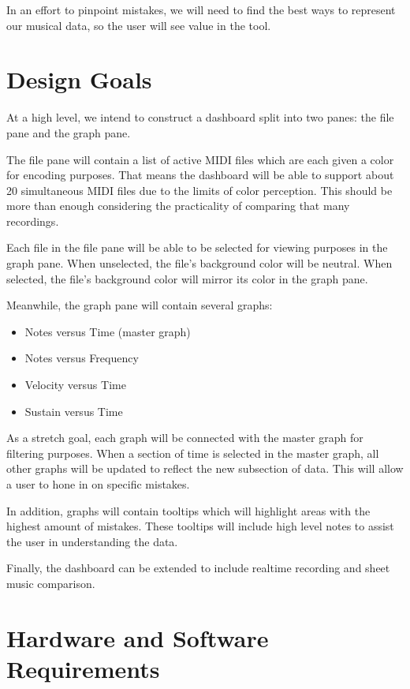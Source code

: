 \documentclass[journal]{vgtc}                %
\begin{document}
In an effort to pinpoint mistakes, we will need to find the best ways to
represent our musical data, so the user will see value in the tool.

\section{Design Goals}

At a high level, we intend to construct a dashboard split into two panes: the
file pane and the graph pane.

The file pane will contain a list of active MIDI files which are each given a
color for encoding purposes. That means the dashboard will be able to support
about 20 simultaneous MIDI files due to the limits of color perception. This
should be more than enough considering the practicality of comparing that many
recordings.

Each file in the file pane will be able to be selected for viewing purposes
in the graph pane. When unselected, the file's background color will be neutral.
When selected, the file's background color will mirror its color in the graph
pane.

Meanwhile, the graph pane will contain several graphs:

\begin{itemize}
\item Notes versus Time (master graph)
\item Notes versus Frequency
\item Velocity versus Time
\item Sustain versus Time
\end{itemize}

As a stretch goal, each graph will be connected with the master graph for
filtering purposes. When a section of time is selected in the master graph,
all other graphs will be updated to reflect the new subsection of data. This
will allow a user to hone in on specific mistakes.

In addition, graphs will contain tooltips which will highlight areas with
the highest amount of mistakes. These tooltips will include high level notes
to assist the user in understanding the data.

Finally, the dashboard can be extended to include realtime recording and sheet
music comparison.

\section{Hardware and Software Requirements}
\end{document}
